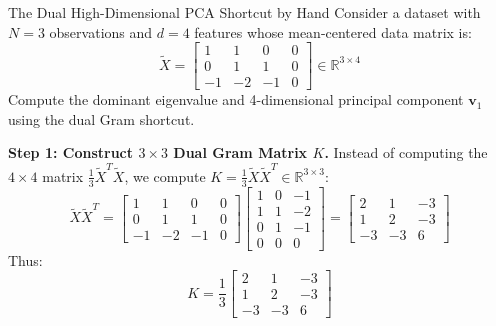 \begin{examplebox}{The Dual High-Dimensional PCA Shortcut by Hand}
Consider a dataset with $N = 3$ observations and $d = 4$ features whose mean-centered data matrix is:
\begin{equation}
\tilde{X} = \begin{bmatrix} 1 & 1 & 0 & 0 \\ 0 & 1 & 1 & 0 \\ -1 & -2 & -1 & 0 \end{bmatrix} \in \mathbb{R}^{3 \times 4}
\end{equation}
Compute the dominant eigenvalue and 4-dimensional principal component $\mathbf{v}_1$ using the dual Gram shortcut.

\textbf{Step 1: Construct $3 \times 3$ Dual Gram Matrix $K$.}
Instead of computing the $4 \times 4$ matrix $\frac{1}{3}\tilde{X}^T \tilde{X}$, we compute $K = \frac{1}{3}\tilde{X}\tilde{X}^T \in \mathbb{R}^{3 \times 3}$:
\begin{equation}
\tilde{X}\tilde{X}^T = \begin{bmatrix} 1 & 1 & 0 & 0 \\ 0 & 1 & 1 & 0 \\ -1 & -2 & -1 & 0 \end{bmatrix} \begin{bmatrix} 1 & 0 & -1 \\ 1 & 1 & -2 \\ 0 & 1 & -1 \\ 0 & 0 & 0 \end{bmatrix} = \begin{bmatrix} 2 & 1 & -3 \\ 1 & 2 & -3 \\ -3 & -3 & 6 \end{bmatrix}
\end{equation}
Thus:
\begin{equation}
K = \frac{1}{3} \begin{bmatrix} 2 & 1 & -3 \\ 1 & 2 & -3 \\ -3 & -3 & 6 \end{bmatrix}
\end{equation}


\end{examplebox}
